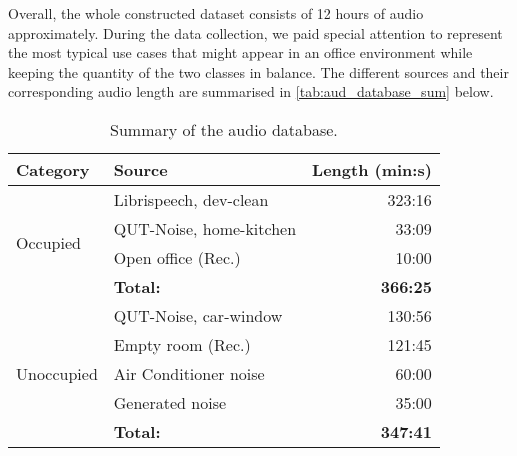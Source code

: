  Overall, the whole constructed dataset consists of 12 hours of audio approximately. During the data collection, we paid special attention to represent the most typical use cases that might appear in an office environment while keeping the quantity of the two classes in balance. The different sources and their corresponding audio length are summarised in \autoref{tab:aud_database_sum} below.
\begin{table}[ht]
\centering
\begin{tabular}[t]{|l|l|r|}
\hline
\textbf{Category}           &   \textbf{Source}             & \textbf{Length (min:s)}\\
\hline
\multirow{4}{*}{Occupied}   &   Librispeech, dev-clean      &  323:16\\
                            &   QUT-Noise, home-kitchen     &   33:09\\
                            &   Open office (Rec.)          &   10:00\\
\cline{2-3}
                            &   \textbf{Total:}             &  \textbf{366:25}\\
\hline
\multirow{5}{*}{Unoccupied} &   QUT-Noise, car-window        &  130:56\\
                            &   Empty room (Rec.)           &   121:45\\
                            &   Air Conditioner noise       &   60:00\\
                            &   Generated noise             &   35:00\\
\cline{2-3}
                            &   \textbf{Total:}             &  \textbf{347:41}\\
\hline
\end{tabular}
\caption{Summary of the audio database.}
\label{tab:aud_database_sum}
\end{table}%





